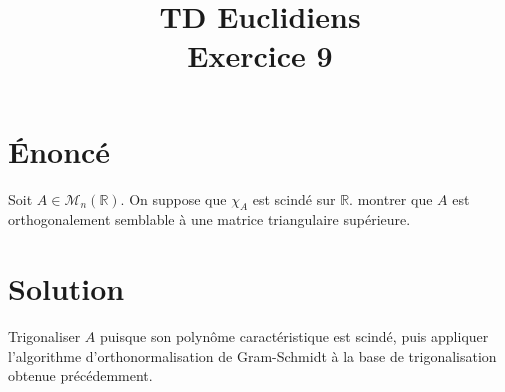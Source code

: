 \documentclass[french]{article}
\title{TD Euclidiens\\ Exercice 9}
\date{}
\newcommand{\R}{\mathbb{R}}
\begin{document}
\maketitle

\section{Énoncé}
Soit $A\in\mathcal{M}_n(\R)$. On suppose que $\chi_A$ est scindé sur $\R$. montrer que $A$ est orthogonalement semblable à une matrice triangulaire supérieure.
\section{Solution}
Trigonaliser $A$ puisque son polynôme caractéristique est scindé, puis appliquer l'algorithme d'orthonormalisation de Gram-Schmidt à la base de trigonalisation obtenue précédemment.
\end{document}
